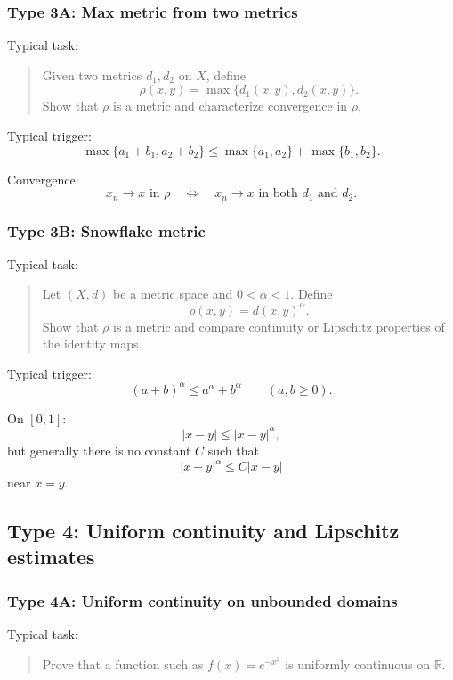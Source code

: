 \subsubsection*{Type 3A: Max metric from two metrics}

Typical task:
\begin{quote}
    Given two metrics $d_1,d_2$ on $X$, define
    \[
        \rho(x,y)=\max\{d_1(x,y),d_2(x,y)\}.
    \]
    Show that $\rho$ is a metric and characterize convergence in $\rho$.
\end{quote}

Typical trigger:
\[
    \max\{a_1+b_1,a_2+b_2\}
    \leq
    \max\{a_1,a_2\}+\max\{b_1,b_2\}.
\]

Convergence:
\[
    x_n\to x \text{ in } \rho
    \quad \Longleftrightarrow \quad
    x_n\to x \text{ in both } d_1 \text{ and } d_2.
\]

\subsubsection*{Type 3B: Snowflake metric}

Typical task:
\begin{quote}
    Let $(X,d)$ be a metric space and $0<\alpha<1$. Define
    \[
        \rho(x,y)=d(x,y)^\alpha.
    \]
    Show that $\rho$ is a metric and compare continuity or Lipschitz properties of the identity maps.
\end{quote}

Typical trigger:
\[
    (a+b)^\alpha\leq a^\alpha+b^\alpha
    \qquad (a,b\geq 0).
\]

On $[0,1]$:
\[
    |x-y|\leq |x-y|^\alpha,
\]
but generally there is no constant $C$ such that
\[
    |x-y|^\alpha\leq C|x-y|
\]
near $x=y$.

\subsection{Type 4: Uniform continuity and Lipschitz estimates}

\subsubsection*{Type 4A: Uniform continuity on unbounded domains}

Typical task:
\begin{quote}
    Prove that a function such as $f(x)=e^{-x^2}$ is uniformly continuous on $\mathbb R$.
\end{quote}

